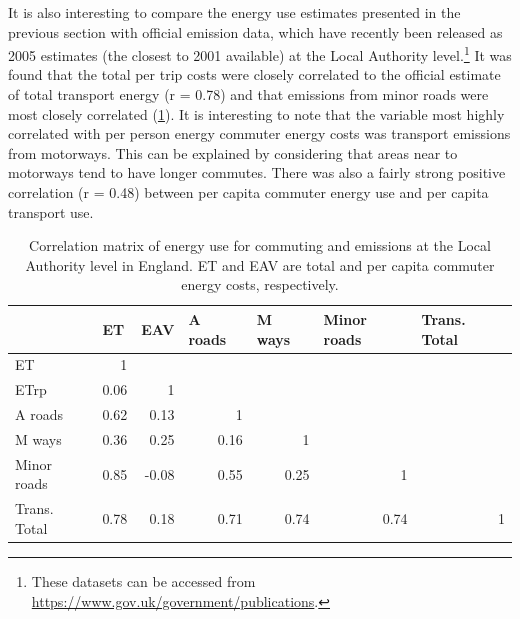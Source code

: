\documentclass[a4paper, 11pt, twoside]{Thesis}
\begin{document}
It is also interesting to compare the energy use estimates presented in the
previous section with official emission data, which have recently been
released as 2005 estimates (the closest to 2001 available) at the Local Authority
level.\footnote{These datasets can be accessed from {\color{blue}
\href{https://www.gov.uk/government/publications/local-authority-emissions-estimates}
{https://www.gov.uk/government/publications}}.
}
It was found that the total per trip costs were closely correlated to the
official estimate of total transport energy (r = 0.78) and that emissions
from minor roads were most closely correlated (\cref{tco2cor}). 
It is interesting to note that the variable most highly correlated
with per person energy commuter energy costs was transport emissions
from motorways. This can be explained by considering that areas near to
motorways tend to have longer commutes. There was also a fairly strong
positive correlation (r = 0.48) between per capita commuter energy use
and per capita transport use.

\begin{table}[htbp]
\caption[Correlation matrix of energy use for commuting and emissions]
{Correlation matrix of energy use for commuting and emissions at the Local
Authority level in England. ET and EAV are total and per capita commuter energy
costs, respectively.}
\begin{tabular}{lrrrrrr}
\toprule
 & \multicolumn{1}{l}{ET} & \multicolumn{1}{l}{EAV} & \multicolumn{1}{l}{A roads} & \multicolumn{1}{l}{M ways} & \multicolumn{1}{l}{Minor roads} & \multicolumn{1}{l}{Trans. Total} \\
 \midrule
ET & 1 &  &  &  &  &  \\
ETrp & 0.06 & 1 &  &  &  &  \\
A roads & 0.62 & 0.13 & 1 &  &  &  \\
M ways & 0.36 & 0.25 & 0.16 & 1 &  &  \\
Minor roads & 0.85 & -0.08 & 0.55 & 0.25  & 1 &  \\
Trans. Total & 0.78 & 0.18 & 0.71 & 0.74 & 0.74 & 1 \\
\bottomrule
\end{tabular}
\label{tco2cor}
\end{table}
\end{document}
